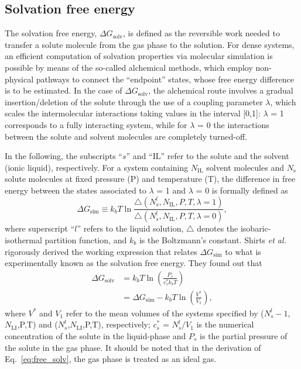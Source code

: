 \documentclass[3p,twocolumn]{elsarticle}
\begin{document}
\subsection*{Solvation free energy}
The solvation free energy, $\Delta G_{\text{solv}}$, is defined as the reversible work needed to transfer a solute molecule from the gas phase to the solution.
For dense systems, an efficient computation of solvation properties via molecular simulation is possible by means of the so-called alchemical methods, which employ non-physical pathways to connect the ``endpoint'' states, whose free energy difference is to be estimated.
In the case of $\Delta G_{\text{solv}}$, the alchemical route involves a gradual insertion/deletion of the solute through the use of a coupling parameter $\lambda$, which scales the intermolecular interactions taking values in the interval [0,1]: $\lambda$ = 1 corresponds to a fully interacting system, while for $\lambda$ = 0 the interactions between the solute and solvent molecules are completely turned-off.

In the following, the subscripts ``$s$'' and ``$\text{IL}$'' refer to the solute and the solvent (ionic liquid), respectively.
For a system containing $N_{\text{IL}}$ solvent molecules and $N_{\text{s}}$ solute molecules at fixed pressure (P) and temperature (T), the difference in free energy between the states associated to $\lambda$ = 1 and $\lambda$ = 0 is formally defined as
\begin{equation}
\Delta G_{\text{sim}} \equiv k_b T \ln \frac{\bigtriangleup (N_s^l,N_{\text{IL}},P,T,\lambda = 1)}{\bigtriangleup (N_s^l,N_{\text{IL}},P,T,\lambda = 0)}, 
\end{equation}
where superscript ``$l$'' refers to the liquid solution, $\bigtriangleup$ denotes the isobaric-isothermal partition function, and $k_b$ is the Boltzmann's constant.
Shirts \textit{et al.} \cite{Shirts_2003} rigorously derived the working expression that relates $\Delta G_{\text{sim}}$ to what is experimentally known as the solvation free energy.
They found out that
\begin{equation}
\begin{split}
\label{eq:free_solv}
 \Delta G_{\text{solv}}& =  k_b T \ln \left( \frac{P_s}{c_s^{\ast} k_b T} \right)\\ &= \Delta G_{\text{sim}} - k_bT \ln \left( \frac{V^{\ast}}{V_1} \right),
\end{split}
\end{equation}
where $V^{\ast}$ and $V_1$ refer to the mean volumes of the systems specified by ($N_s^l-1$,$N_{\text{LI}}$,P,T) and ($N_s^l$,$N_{\text{LI}}$,P,T), respectively; $c_s^{\ast}$ = $N_s^l/V_1$ is the numerical concentration of the solute in the liquid-phase and $P_s$ is the partial pressure of the solute in the gas phase.
It should be noted that in the derivation of Eq.~\eqref{eq:free_solv}, the gas phase is treated as an ideal gas. 
\end{document}
